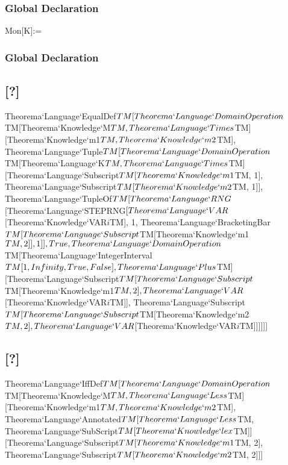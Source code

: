 \documentclass{article}
\begin{document}
\begin{tmaenvironmentgd}
\subsubsection{Global Declaration}
Mon[K]:=\end{tmaenvironmentgd}
\begin{tmaenvironmentgd}
\subsubsection{Global Declaration}
\end{tmaenvironmentgd}
\begin{tmaenvironment}
\subsection{[?]}
Theorema`Language`EqualDef$TM[Theorema`Language`DomainOperation$TM[Theorema`Knowledge`M$TM, Theorema`Language`Times$TM][Theorema`Knowledge`m1$TM, Theorema`Knowledge`m2$TM], Theorema`Language`Tuple$TM[Theorema`Language`DomainOperation$TM[Theorema`Language`K$TM, Theorema`Language`Times$TM][Theorema`Language`Subscript$TM[Theorema`Knowledge`m1$TM, 1], Theorema`Language`Subscript$TM[Theorema`Knowledge`m2$TM, 1]], Theorema`Language`TupleOf$TM[Theorema`Language`RNG$[Theorema`Language`STEPRNG$[Theorema`Language`VAR$[Theorema`Knowledge`VAR$i$TM], 1, Theorema`Language`BracketingBar$TM[Theorema`Language`Subscript$TM[Theorema`Knowledge`m1$TM, 2]], 1]], True, Theorema`Language`DomainOperation$TM[Theorema`Language`IntegerInterval$TM[1, Infinity, True, False], Theorema`Language`Plus$TM][Theorema`Language`Subscript$TM[Theorema`Language`Subscript$TM[Theorema`Knowledge`m1$TM, 2], Theorema`Language`VAR$[Theorema`Knowledge`VAR$i$TM]], Theorema`Language`Subscript$TM[Theorema`Language`Subscript$TM[Theorema`Knowledge`m2$TM, 2], Theorema`Language`VAR$[Theorema`Knowledge`VAR$i$TM]]]]]]\end{tmaenvironment}
\begin{tmaenvironment}
\subsection{[?]}
Theorema`Language`IffDef$TM[Theorema`Language`DomainOperation$TM[Theorema`Knowledge`M$TM, Theorema`Language`Less$TM][Theorema`Knowledge`m1$TM, Theorema`Knowledge`m2$TM], Theorema`Language`Annotated$TM[Theorema`Language`Less$TM, Theorema`Language`SubScript$TM[Theorema`Knowledge`lex$TM]][Theorema`Language`Subscript$TM[Theorema`Knowledge`m1$TM, 2], Theorema`Language`Subscript$TM[Theorema`Knowledge`m2$TM, 2]]]\end{tmaenvironment}
\end{document}
